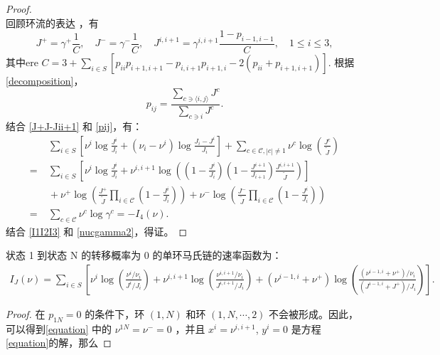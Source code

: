 \begin{appendices}
\begin{proof}
\begin{equation}
\end{equation}
回顾环流的表达 \cite[Theorem.1.3.3]{jiang2004mathematical}，有
\begin{equation}\label{J+J-Jii+1}
J^+=\gamma^+\frac{1}{C},\quad J^-=\gamma^-\frac{1}{C},\quad J^{i,i+1}=\gamma^{i,i+1}\frac{1-p_{i-1,i-1}}{C}, \quad 1\le i\le 3,
\end{equation}
其中ere $C=3+\sum_{i\in S}[p_{ii}p_{i+1,i+1}-p_{i,i+1}p_{i+1,i}-2(p_{ii}+p_{i+1,i+1})]$. 根据 \eqref{decomposition}，
\begin{equation}\label{pij}
	p_{ij}=\frac{\sum_{c \ni \langle i,j\rangle}J^c}{\sum_{c\ni i}J^c}.
\end{equation}
结合 \eqref{J+J-Jii+1} 和 \eqref{pij}，有：
\begin{equation}\label{nucgamma2}
	\begin{split}
		&\;\sum_{i \in S}\left[\nu^i\log\frac{J^i}{J_i}+\left(\nu_i-\nu^i\right)\log\frac{J_i-J^i}{J_i}\right]+ \sum_{c \in \mathcal{C}, |c|\neq 1} \nu^{c} \log \left(\frac{J^c}{\tilde{J}}\right)\\
		=&\;\sum_{i \in S}\left[\nu^i\log\frac{J^i}{J_i}+\nu^{i,i+1}\log\left(\left(1-\frac{J^i}{J_i}\right)\left(1-\frac{J^{i+1}}{J_{i+1}}\right)\frac{J^{i,i+1}}{\tilde{J}}\right)\right]\\
		&\;+\nu^+\log\left(\frac{J^+}{\tilde{J}}\prod_{i\in\mathcal{C}}\left(1-\frac{J^i}{J_i}\right)\right)+\nu^-\log\left(\frac{J^-}{\tilde{J}}\prod_{i\in\mathcal{C}}\left(1-\frac{J^i}{J_i}\right)\right)\\
		=&\;\sum_{c \in \mathcal{C}}\nu^c \log\gamma^c=-I_4(\nu).
	\end{split}
\end{equation}
结合 \eqref{I1I2I3} 和 \eqref{nucgamma2}，得证。
\end{proof}
\begin{proposition}
	状态 1 到状态 N 的转移概率为 0 的单环马氏链的速率函数为：
	\begin{equation*}
		\begin{split}
			I_J(\nu) = \sum_{i\in S}\left[\nu^i\log\left(\frac{\nu^i/\nu_i}{J^i/J_i}\right)
			+\nu^{i,i+1}\log\left(\frac{\nu^{i,i+1}/\nu_i}{J^{i,i+1}/J_i}\right)+\left(\nu^{i-1,i}+\nu^+\right)\log\left(\frac{\left(\nu^{i-1,i}+\nu^+\right)/\nu_i}
			{\left(J^{i-1,i}+J^+\right)/J_i}\right)\right].
		\end{split}
	\end{equation*}
\end{proposition}
\begin{proof}
	在 $p_{1N}=0$ 的条件下，环 $(1,N)$ 和环 $(1,N,\cdots,2)$ 不会被形成。因此，可以得到\eqref{equation} 中的 $\nu^{1N}=\nu^{-}=0$ ，并且 $x^{i}=\nu^{i,i+1}$, $y^{i}=0$ 是方程 \eqref{equation}的解，那么

\end{proof}
\end{appendices}
